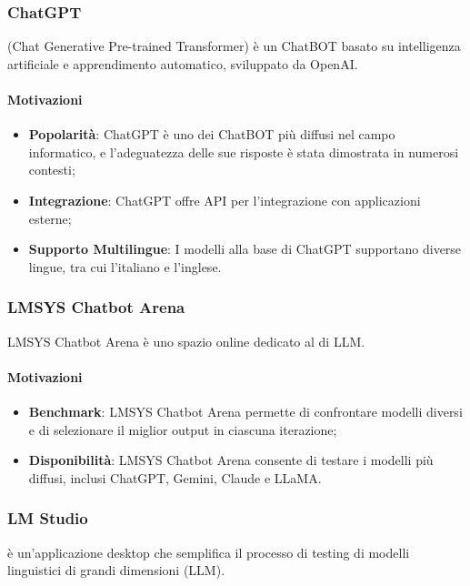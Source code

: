 \subsubsection{ChatGPT}\label{sec:chatgpt}
\par {} (Chat Generative Pre-trained Transformer) è un ChatBOT basato su intelligenza artificiale e apprendimento automatico, sviluppato da OpenAI.
\paragraph*{Motivazioni}
\begin{itemize}
  \item \textbf{Popolarità}: ChatGPT è uno dei ChatBOT più diffusi nel campo informatico, e l'adeguatezza delle sue risposte è stata dimostrata in numerosi contesti;
  \item \textbf{Integrazione}: ChatGPT offre API per l'integrazione con applicazioni esterne;
  \item \textbf{Supporto Multilingue}: I modelli alla base di ChatGPT supportano diverse lingue, tra cui l'italiano e l'inglese.
\end{itemize}

\subsubsection{LMSYS Chatbot Arena}\label{sec:lmsys}
\par LMSYS Chatbot Arena è uno spazio online dedicato al  di LLM.
\paragraph*{Motivazioni}
\begin{itemize}
  \item \textbf{Benchmark}: LMSYS Chatbot Arena permette di confrontare modelli diversi e di selezionare il miglior output in ciascuna iterazione;
  \item \textbf{Disponibilità}: LMSYS Chatbot Arena consente di testare i modelli più diffusi, inclusi ChatGPT, Gemini, Claude e LLaMA.
\end{itemize}

\subsubsection{LM Studio}\label{sec:lmstudio}
\par {} è un'applicazione desktop che semplifica il processo di testing di modelli linguistici di grandi dimensioni (LLM).
